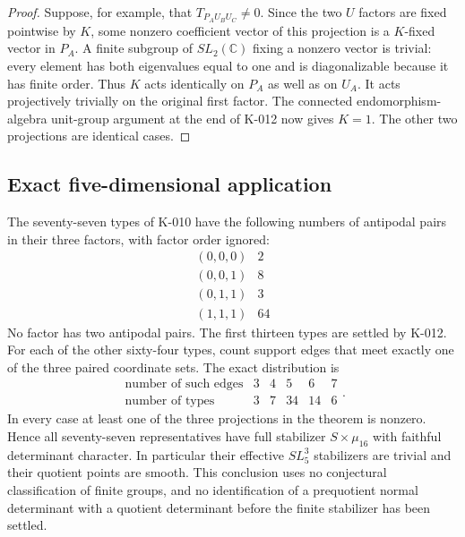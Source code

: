 \begin{proof}
Suppose, for example, that $T_{P_AU_BU_C}\ne0$.  Since the two $U$
factors are fixed pointwise by $K$, some nonzero coefficient vector
of this projection is a $K$-fixed vector in $P_A$.  A finite subgroup
of $SL_2(\mathbb C)$ fixing a nonzero vector is trivial: every element
has both eigenvalues equal to one and is diagonalizable because it
has finite order.  Thus $K$ acts identically on $P_A$ as well as on
$U_A$.  It acts projectively trivially on the original first factor.
The connected endomorphism-algebra unit-group argument at the end of
K-012 now gives $K=1$.  The other two projections are identical cases.
\end{proof}

\subsection*{Exact five-dimensional application}
The seventy-seven types of K-010 have the following numbers of
antipodal pairs in their three factors, with factor order ignored:
\[
\begin{array}{c|r}
 (0,0,0)&2\\
 (0,0,1)&8\\
 (0,1,1)&3\\
 (1,1,1)&64
\end{array}                                                  \tag{K-013b}
\]
No factor has two antipodal pairs.  The first thirteen types are
settled by K-012.  For each of the other sixty-four types, count
support edges that meet exactly one of the three paired coordinate
sets.  The exact distribution is
\[
\begin{array}{c|rrrrr}
 \text{number of such edges}&3&4&5&6&7\\\hline
 \text{number of types}&3&7&34&14&6
\end{array}.                                                 \tag{K-013c}
\]
In every case at least one of the three projections in the theorem
is nonzero.  Hence all seventy-seven representatives have full
stabilizer $S\times\mu_{16}$ with faithful determinant character.
In particular their effective $SL_5^3$ stabilizers are trivial and
their quotient points are smooth.  This conclusion uses no conjectural
classification of finite groups, and no identification of a
prequotient normal determinant with a quotient determinant before
the finite stabilizer has been settled.
